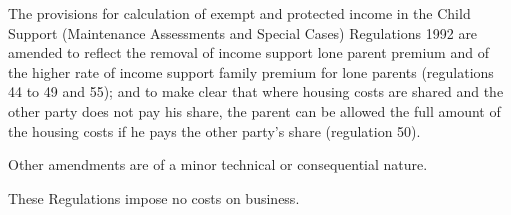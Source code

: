 \documentclass[12pt,a4paper]{article}
\begin{document}
  The provisions for calculation of exempt and protected income in the Child Support (Maintenance Assessments and Special Cases) Regulations 1992 are amended to reflect the removal of income support lone parent premium and of the higher rate of income support family premium for lone parents (regulations 44 to 49 and 55); and to make clear that where housing costs are shared and the other party does not pay his share, the parent can be allowed the full amount of the housing costs if he pays the other party’s share (regulation 50).

  Other amendments are of a minor technical or consequential nature.

  These Regulations impose no costs on business.
\end{document}
